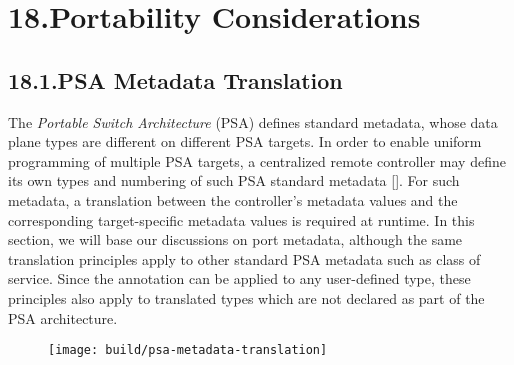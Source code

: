 \documentclass[11pt]{article}
\begin{document}
{%
\section{18.\hspace*{0.5em}Portability Considerations}\label{sec-portability-considerations}%

\subsection{18.1.\hspace*{0.5em}PSA Metadata Translation}\label{sec-psa-metadata-translation}%

\noindent{}The \emph{Portable Switch Architecture} (PSA) defines standard metadata, whose
data plane types are different on different PSA targets. In order to enable
uniform programming of multiple PSA targets, a centralized remote controller may
define its own types and numbering of such PSA standard metadata
[]. For such metadata, a translation between the controller's
metadata values and the corresponding target-specific metadata values is
required at runtime. In this section, we will base our discussions on port
metadata, although the same translation principles apply to other standard PSA
metadata such as class of service. Since the  annotation
can be applied to any user-defined type, these principles also apply to
translated types which are not declared as part of the PSA architecture.%

\begin{figure}[tbp]%
\begin{mdcenter}%

\noindent{}\texttt{[image: build/psa-metadata-translation]}{}%

\mdhr{}%

\noindent{}%
\end{mdcenter}\label{fig-psa-metadata-translation}%
\end{figure}%

}
\end{document}
